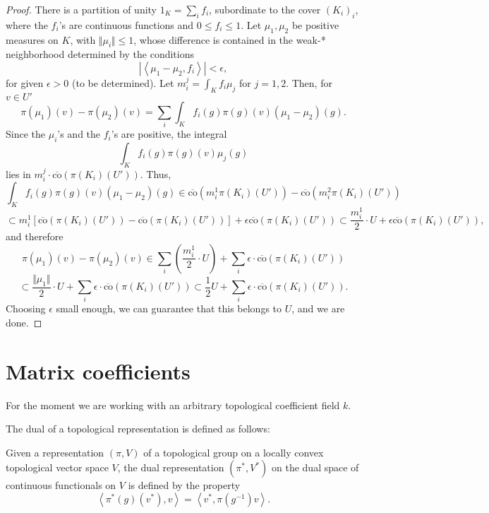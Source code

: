 \begin{proof}
There is a partition of unity $1_K=\sum_i f_i$, subordinate to the cover $(K_i)_i$, where the $f_i$'s are continuous functions and $0\le f_i\le 1$. 
Let $\mu_1, \mu_2$ be positive measures on $K$, with $\Vert \mu_i\Vert\le 1$, whose difference is contained in the weak-* neighborhood determined by the conditions
$$ |\left< \mu_1-\mu_2, f_i \right>| <\epsilon,$$
for given $\epsilon >0$ (to be determined). Let $m_i^j = \int_K f_i \mu_j$ for $j=1,2$.
Then, for $v\in U'$
$$ \pi(\mu_1)(v) - \pi(\mu_2) (v) = \sum_i \int_K f_i(g) \pi(g)(v) (\mu_1-\mu_2)(g).$$
Since the $\mu_i$'s and the $f_i$'s are positive, the integral 
$$ \int_K f_i(g) \pi(g)(v) \mu_j(g)$$
lies in $m_i^j \cdot \overline{\text{co}}(\pi(K_i)(U'))$. Thus, 
$$\int_K f_i(g) \pi(g)(v) (\mu_1-\mu_2)(g) \in \overline{\text{co}}\left(m_i^1 \pi(K_i)(U')\right) - \overline{\text{co}}\left(m_i^2 \pi(K_i)(U')\right)$$ 
$$\subset  m_i^1 \left[\overline{\text{co}}\left(\pi(K_i)(U')\right) - \overline{\text{co}}\left(\pi(K_i)(U')\right) \right] + \epsilon \overline{\text{co}}\left(\pi(K_i)(U')\right)  \subset \frac{m_i^1}{2} \cdot U + \epsilon \overline{\text{co}}\left(\pi(K_i)(U')\right),$$
and therefore 
$$ \pi(\mu_1)(v) - \pi(\mu_2) (v) \in \sum_i (\frac{m_i^1}{2} \cdot U) + \sum_i \epsilon \cdot \overline{\text{co}}\left(\pi(K_i)(U')\right)$$
$$\subset \frac{\Vert \mu_1\Vert}{2} \cdot U + \sum_i \epsilon \cdot \overline{\text{co}}\left(\pi(K_i)(U')\right) \subset \frac{1}{2} U + \sum_i \epsilon \cdot \overline{\text{co}}\left(\pi(K_i)(U')\right).$$
Choosing $\epsilon$ small enough, we can guarantee that this belongs to $U$, and we are done. 

\end{proof}






\section{Matrix coefficients} 
\label{section-matrixcoefficients}

For the moment we are working with an arbitrary topological coefficient field $k$.

The dual of a topological representation is defined as follows:
\begin{definition}
\label{definition-dual-representation}
Given a representation $(\pi, V)$ of a topological group on a locally convex topological vector space $V$, the dual representation $(\pi^*,V^*)$ on the dual space of continuous functionals on $V$ is defined by the property
 $$ \left< \pi^*(g)(v^*), v\right> = \left< v^*, \pi(g^{-1}) v\right>.$$
\end{definition}

